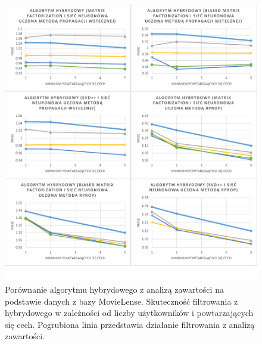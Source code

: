 \documentclass[twoside]{iisthesis}
\begin{document}
		\begin{figure}[!ht]
			\centering
			\includegraphics[page=2,width=1\textwidth]{exphybrid_movielens1}
			\caption{Porównanie algorytmu hybrydowego z analizą zawartości na podstawie danych z bazy MovieLense. Skuteczność filtrowania z hybrydowego w zależności od liczby użytkowników i powtarzających się cech. Pogrubiona linia przedstawia działanie filtrowania z analizą zawartości.}
			\label{fig:exphybrid_movielens1b}
		\end{figure}
		
		
\end{document}
